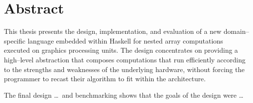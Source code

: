 
\chapter{Abstract}

This thesis presents the design, implementation, and evaluation of a new
domain--specific language embedded within Haskell for nested array computations
executed on graphics processing units. The design concentrates on providing a
high--level abstraction that composes computations that run efficiently
according to the strengths and weaknesses of the underlying hardware, without
forcing the programmer to recast their algorithm to fit within the architecture.

The final design \ldots\ and benchmarking shows that the goals of the design were
\ldots

